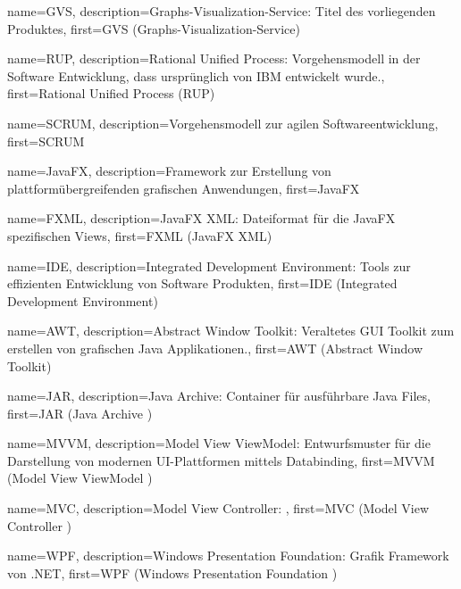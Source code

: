 



{
	name={GVS},
	description={Graphs-Visualization-Service: Titel des vorliegenden Produktes},
	first={GVS (Graphs-Visualization-Service)}
}

{
	name={RUP},
	description={Rational Unified Process: Vorgehensmodell in der Software Entwicklung, dass ursprünglich von IBM entwickelt wurde.},
	first={Rational Unified Process (RUP)}
}

{
	name={SCRUM},
	description={Vorgehensmodell zur agilen Softwareentwicklung},
	first={SCRUM}
}

{
	name={JavaFX},
	description={Framework zur Erstellung von plattformübergreifenden grafischen Anwendungen},
	first={JavaFX}
}

{
	name={FXML},
	description={JavaFX XML: Dateiformat für die JavaFX spezifischen Views},
	first={FXML (JavaFX XML)}
}

{
	name={IDE},
	description={Integrated Development Environment: Tools zur effizienten Entwicklung von Software Produkten},
	first={IDE (Integrated Development Environment)}
}

{
	name={AWT},
	description={Abstract Window Toolkit: Veraltetes GUI Toolkit zum erstellen von grafischen Java Applikationen.},
	first={AWT (Abstract Window Toolkit)}
}

{
	name={JAR},
	description={Java Archive: Container für ausführbare Java Files},
	first={JAR (Java Archive )}
}

{
	name={MVVM},
	description={Model View ViewModel: Entwurfsmuster für die Darstellung von modernen UI-Plattformen mittels Databinding},
	first={MVVM (Model View ViewModel )}
}

{
	name={MVC},
	description={Model View Controller: },
	first={MVC (Model View Controller )}
}

{
	name={WPF},
	description={Windows Presentation Foundation: Grafik Framework von .NET},
	first={WPF (Windows Presentation Foundation )}
}



